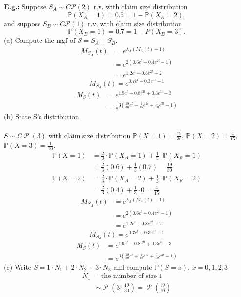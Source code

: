 \documentclass[a4paper]{article}
\newcommand{\n}{\hfill\break}
\newcommand{\eg}[1]{\par\noindent\settowidth{\hangindent}{\textbf{E.g.: }}\textbf{E.g.: }#1\n}
\newcommand{\Prob}{\mathbb{P}}
\renewcommand{\P}{\Prob}
\DeclareMathOperator{\Poiss}{\mathcal{P}}
\begin{document}
\eg{
    Suppose $S_A\sim C\mathcal{P}(2)$ r.v. with claim size distribution
    \[\P(X_A=1)=0.6=1-\P(X_A=2),\]
    and suppose $S_B\sim C\mathcal{P}(1)$ r.v. with claim size distribution
    \[\P(X_B=1)=0.7=1-P(X_B=3).\]
    (a) Compute the mgf of $S=S_A+S_B$.
    \begin{align*}
        M_{S_A}(t)&=e^{\lambda_A(M_A(t)-1)} \\
        &=e^{2(0.6e^t+0.4e^{2t}-1)} \\
        &=e^{1.2e^t+0.8e^{2t}-2}
    \end{align*}
    \[M_{S_B}(t)=e^{0.7e^t+0.3e^{3t}-1}\]
    \begin{align*}
        M_S(t)&=e^{1.9e^t+0.8e^{2t}+0.3e^{3t}-3} \\
        &=e^{3\left(\frac{19}{30}e^t+\frac{4}{15}e^{2t}+\frac{1}{10}e^{3t}-1\right)}
    \end{align*}
    (b) State S's distribution.
    \\\\
    $S\sim C\Poiss(3)$ with claim size distribution $\P(X=1)=\frac{19}{30}$, $\P(X=2)=\frac{4}{15}$, $\P(X=3)=\frac{1}{10}$.
    \begin{align*}
        \P(X=1)&=\frac{2}{3}\cdot\P(X_A=1)+\frac{1}{3}\cdot\P(X_B=1) \\
        &=\frac{2}{3}(0.6)+\frac{1}{3}(0.7)=\frac{19}{30}
    \end{align*}
    \begin{align*}
        \P(X=2)&=\frac{2}{3}\cdot\P(X_A=2)+\frac{1}{3}\cdot\P(X_B=2) \\
        &=\frac{2}{3}(0.4)+\frac{1}{3}\cdot0=\frac{4}{15}
    \end{align*}
    \begin{align*}
        M_{S_A}(t)&=e^{\lambda_A(M_A(t)-1)} \\
        &=e^{2(0.6e^t+0.4e^{2t}-1)} \\
        &=e^{1.2e^t+0.8e^{2t}-2}
    \end{align*}
    \[M_{S_B}(t)=e^{0.7e^t+0.3e^{3t}-1}\]
    \begin{align*}
        M_S(t)&=e^{1.9e^t+0.8e^{2t}+0.3e^{3t}-3} \\
        &=e^{3(\frac{19}{30}e^t+\frac{4}{15}e^{2t}+\frac{1}{10}e^{3t}-1)}
    \end{align*}
    (c) Write $S=1\cdot N_1+2\cdot N_2+3\cdot N_3$ and compute $\P(S=x)$, $x=0,1,2,3$
    \begin{align*}
        N_1&=\text{the number of size 1} \\
        &\sim\Poiss\left(3\cdot\frac{19}{30}\right)=\Poiss\left(\frac{19}{10}\right)

\end{align*}}
\end{document}
